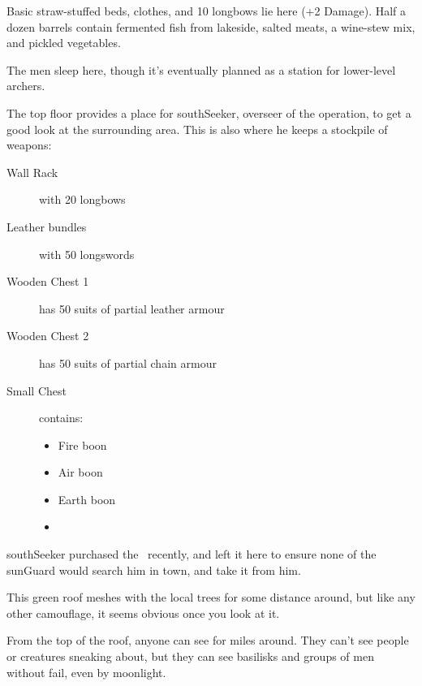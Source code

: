 \begin{multicols}{2}
\southSeeker

\showStdSpells


Basic straw-stuffed beds, clothes, and 10 longbows lie here (+2 Damage).
Half a dozen barrels contain fermented fish from \gls{lakeside}, salted meats, a wine-stew mix, and pickled vegetables.


The men sleep here, though it's eventually planned as a station for lower-level archers.


The top floor provides a place for \gls{southSeeker}, overseer of the operation, to get a good look at the surrounding area.
This is also where he keeps a stockpile of weapons:

\begin{description}
  \item[Wall Rack]
  with
  20 longbows
  \item[Leather bundles]
  with
  50 longswords
  \item[Wooden Chest 1]
  has
  50 suits of partial leather armour
  \item[Wooden Chest 2]
  has
  50 suits of partial chain armour
  \item[Small Chest]
  contains:
  \begin{itemize}
    \item
    Fire \gls{boon}
    \item
    Air \gls{boon}
    \item
    Earth \gls{boon}
    \item
    \lootMagic
  \end{itemize}
\end{description}

\addtocounter{treasure}{-1}
\Gls{southSeeker} purchased the \lootMagic\ recently, and left it here to ensure none of the \gls{sunGuard} would search him in \gls{town}, and take it from him.

\showTalisman


This green roof meshes with the local trees for some distance around, but like any other camouflage, it seems obvious once you look at it.

From the top of the roof, anyone can see for miles around.
They can't see people or creatures sneaking about, but they can see basilisks and groups of men without fail, even by moonlight.


\end{multicols}
